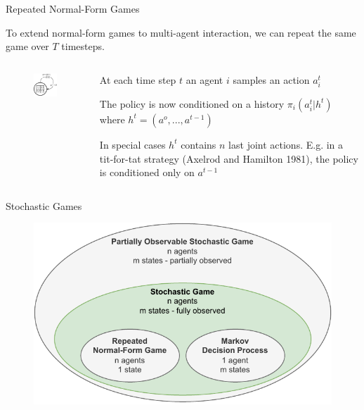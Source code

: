 \begin{frame}{Repeated Normal-Form Games}

To extend normal-form games to  multi-agent interaction, we can repeat the same game over \(T\) timesteps. 

    \begin{columns}
    \begin{column}{0.4\linewidth}
    \begin{figure}
        \centering
        \includegraphics{images/chapter_3/game-models-mg.pdf}
        \label{fig:enter-label}
    \end{figure}
    \end{column}

    \begin{column}{0.6\linewidth}

    \blist
        \item At each time step \(t\) an agent $i$ samples an action \(a^{t}_{i}\)
        \item The policy is now conditioned on a  history \(\pi_i(a_{i}^{t}|h^t)\) where \(h^t = (a^o, ..., a^{t-1})\)
        \item In special cases $h^t$ contains $n$ last joint actions. E.g. in a tit-for-tat strategy (Axelrod and Hamilton 1981), the policy is conditioned only on \(a^{t-1}\)
    \elist
        
    \end{column}
    \end{columns}
\end{frame}

\begin{frame}{Stochastic Games}

\begin{figure}
    \centering
    \includegraphics{images/chapter_3/stochastic_games_hierarchy.pdf}
\end{figure}
\end{frame}

